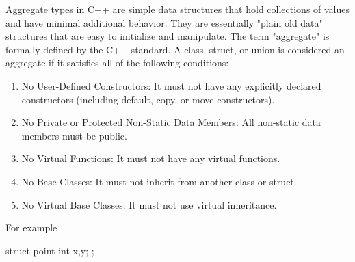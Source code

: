 \documentclass{report}
\begin{document}
    \pagebreak 
    \bigbreak \noindent 
    Aggregate types in C++ are simple data structures that hold collections of values and have minimal additional behavior. They are essentially "plain old data" structures that are easy to initialize and manipulate. The term "aggregate" is formally defined by the C++ standard.
    \bigbreak \noindent 
    A class, struct, or union is considered an aggregate if it satisfies all of the following conditions:
    \begin{enumerate}
        \item No User-Defined Constructors: It must not have any explicitly declared constructors (including default, copy, or move constructors).
        \item No Private or Protected Non-Static Data Members: All non-static data members must be public.
        \item No Virtual Functions: It must not have any virtual functions.
        \item No Base Classes: It must not inherit from another class or struct.
        \item No Virtual Base Classes: It must not use virtual inheritance.
    \end{enumerate}
    \bigbreak \noindent 
    For example
    \bigbreak \noindent 
    \begin{cppcode}
        struct point {
            int x,y;
        };
    \end{cppcode}
    \bigbreak \noindent 
\end{document}
